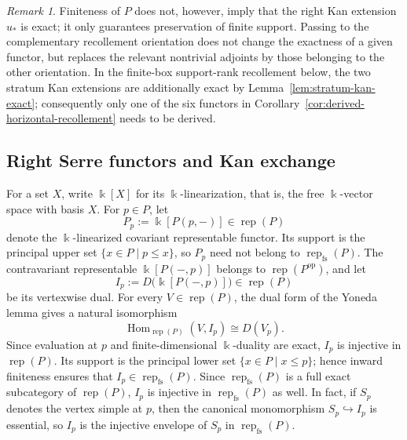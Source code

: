 \documentclass[12pt,reqno]{amsart}
\theoremstyle{definition}
\theoremstyle{remark}
\newtheorem{remark}[theorem]{Remark}
\newcommand{\Rep}{\operatorname{rep}}
\newcommand{\Hom}{\operatorname{Hom}}
\begin{document}
\begin{remark}\label{rem:finite-kan-not-exact}
Finiteness of $P$ does not, however, imply that the right Kan extension $u_*$
is exact; it only guarantees preservation of finite support.  Passing to the
complementary recollement orientation does not change the exactness of a given
functor, but replaces the relevant nontrivial adjoints by those belonging to
the other orientation.  In the finite-box support-rank recollement below, the
two stratum Kan extensions are additionally exact by
Lemma~\ref{lem:stratum-kan-exact}; consequently only one of the six functors
in Corollary~\ref{cor:derived-horizontal-recollement} needs to be derived.
\end{remark}

\subsection{Right Serre functors and Kan exchange}

For a set $X$, write $\Bbbk[X]$ for its $\Bbbk$-linearization, that is, the
free $\Bbbk$-vector space with basis $X$.  For $p\in P$, let
\[
P_p:=\Bbbk[P(p,-)]\in\Rep(P)
\]
denote the $\Bbbk$-linearized covariant representable functor.  Its support is
the principal upper set $\{x\in P\mid p\le x\}$, so $P_p$ need not belong to
$\Rep_{\mathrm{fs}}(P)$.  The contravariant representable
$\Bbbk[P(-,p)]$ belongs to $\Rep(P^{\mathrm{op}})$, and let
\[
I_p:=D\!\bigl(\Bbbk[P(-,p)]\bigr)\in\Rep(P)
\]
be its vertexwise dual.  For every $V\in\Rep(P)$, the dual form of the
Yoneda lemma gives a natural isomorphism
\[
\Hom_{\Rep(P)}(V,I_p)\cong D(V_p).
\]
Since evaluation at $p$ and finite-dimensional $\Bbbk$-duality are exact,
$I_p$ is injective in $\Rep(P)$.  Its support is the principal lower set
$\{x\in P\mid x\le p\}$; hence inward finiteness ensures that
$I_p\in\Rep_{\mathrm{fs}}(P)$.  Since $\Rep_{\mathrm{fs}}(P)$ is a full
exact subcategory of $\Rep(P)$, $I_p$ is injective in
$\Rep_{\mathrm{fs}}(P)$ as well.  In fact, if $S_p$ denotes the vertex
simple at $p$, then the canonical monomorphism $S_p\hookrightarrow I_p$ is
essential, so $I_p$ is the injective envelope of $S_p$ in
$\Rep_{\mathrm{fs}}(P)$.
\end{document}
